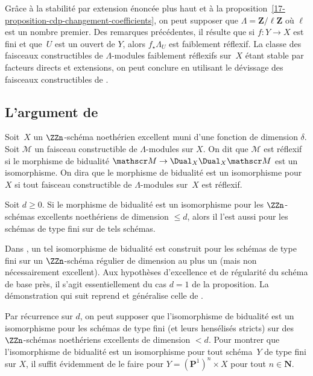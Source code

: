 \documentclass[10pt]{../fichiers-configuration-latex/smfart}
\begin{document}
Grâce à la stabilité par extension énoncée plus haut et à la
proposition~\ref{17-proposition-cdp-changement-coefficients}, on peut supposer
que $\Lambda=\mathbf{Z}/\ell\mathbf{Z}$ où $\ell$ est un nombre premier.
Des remarques précédentes, il résulte que si $f\colon Y\to X$ est fini et
que $U$ est un ouvert de $Y$, alors $f_\star \Lambda_U$ est faiblement
réflexif. La classe des faisceaux constructibles de $\Lambda$-modules
faiblement réflexifs sur $X$ étant stable par facteurs directs et
extensions, on peut conclure en utilisant le dévissage des faisceaux
constructibles de .

\subsection{L'argument de \texorpdfstring{}{[SGA 4\textonehalf{} [Th. finitude] 4.3]}}%

\begin{definition2}
Soit $X$ un $\ZZn$-schéma 
noethérien excellent muni d'une fonction de dimension
$\delta$. Soit $\mathscr M$ un faisceau constructible de $\Lambda$-modules
sur $X$. On dit que $\mathscr M$ est réflexif si le morphisme de
bidualité $\mathscr M\to \Dual_X\Dual_X\mathscr M$ est un isomorphisme. On
dira que le morphisme de bidualité est un isomorphisme pour $X$ si tout
faisceau constructible de $\Lambda$-modules sur $X$ est réflexif.
\end{definition2}

\begin{proposition2}\label{17-proposition-argument-de-sga-4-et-demi}
Soit $d\geq 0$.
Si le morphisme de bidualité est un isomorphisme pour les $\ZZn$-schémas
excellents noethériens de dimension $\leq d$, alors il l'est aussi pour les
schémas de type fini sur de tels schémas.
\end{proposition2}

\begin{remarque2}
Dans , un tel
isomorphisme de bidualité est construit pour les schémas de type
fini sur un $\ZZn$-schéma régulier de dimension au plus un (mais
non nécessairement excellent). Aux hypothèses d'excellence et de régularité
du schéma de base près, il s'agit essentiellement du cas $d=1$ de la
proposition. La démonstration qui suit reprend et généralise celle de 
.
\end{remarque2}

Par récurrence sur $d$, on peut supposer que l'isomorphisme de bidualité
est un isomorphisme pour les schémas de type fini (et leurs hensélisés
stricts) sur des $\ZZn$-schémas noethériens excellents de dimension $<d$.
Pour montrer que l'isomorphisme de bidualité est un isomorphisme pour tout
schéma $Y$ de type fini sur $X$, il suffit évidemment de le faire pour
$Y=(\mathbf{P}^1)^n\times X$ pour tout $n\in\mathbf{N}$.
\end{document}
